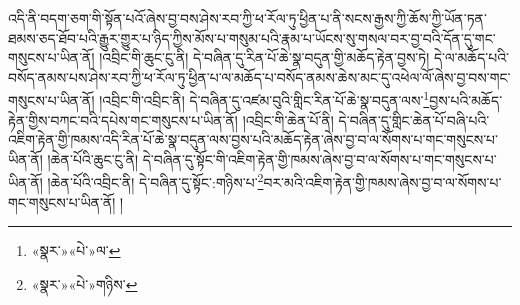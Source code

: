 འདི་ནི་བདག་ཅག་གི་སྟོན་པའོ་ཞེས་བྱ་བས་ཤེས་རབ་ཀྱི་ཕ་རོལ་ཏུ་ཕྱིན་པ་ནི་སངས་རྒྱས་ཀྱི་ཆོས་ཀྱི་ཡོན་ཏན་ཐམས་ཅད་ཐོབ་པའི་རྒྱུར་གྱུར་པ་ཉིད་ཀྱིས་མོས་པ་གསུམ་པའི་རྣམ་པ་ཡོངས་སུ་གསལ་བར་བྱ་བའི་དོན་དུ་གང་གསུངས་པ་ཡིན་ནོ། །འབྲིང་གི་ཆུང་ངུ་ནི། དེ་བཞིན་དུ་རིན་པོ་ཆེ་སྣ་བདུན་གྱི་མཆོད་རྟེན་བྱས་ཏེ། དེ་ལ་མཆོད་པའི་བསོད་ནམས་པས་ཤེས་རབ་ཀྱི་ཕ་རོལ་ཏུ་ཕྱིན་པ་ལ་མཆོད་པ་བསོད་ནམས་ཆེས་མང་དུ་འཕེལ་ལོ་ཞེས་བྱ་བས་གང་གསུངས་པ་ཡིན་ནོ། །འབྲིང་གི་འབྲིང་ནི། དེ་བཞིན་དུ་འཛམ་བུའི་གླིང་རིན་པོ་ཆེ་སྣ་བདུན་ལས་\footnote{«སྣར་»«པེ་»ལ་}བྱས་པའི་མཆོད་རྟེན་གྱིས་བཀང་བའི་དཔེས་གང་གསུངས་པ་ཡིན་ནོ། །འབྲིང་གི་ཆེན་པོ་ནི། དེ་བཞིན་དུ་གླིང་ཆེན་པོ་བཞི་པའི་འཇིག་རྟེན་གྱི་ཁམས་འདི་རིན་པོ་ཆེ་སྣ་བདུན་ལས་བྱས་པའི་མཆོད་རྟེན་ཞེས་བྱ་བ་ལ་སོགས་པ་གང་གསུངས་པ་ཡིན་ནོ། །ཆེན་པོའི་ཆུང་ངུ་ནི། དེ་བཞིན་དུ་སྟོང་གི་འཇིག་རྟེན་གྱི་ཁམས་ཞེས་བྱ་བ་ལ་སོགས་པ་གང་གསུངས་པ་ཡིན་ནོ། །ཆེན་པོའི་འབྲིང་ནི། དེ་བཞིན་དུ་སྟོང་:གཉིས་པ་\footnote{«སྣར་»«པེ་»གཉིས་}བར་མའི་འཇིག་རྟེན་གྱི་ཁམས་ཞེས་བྱ་བ་ལ་སོགས་པ་གང་གསུངས་པ་ཡིན་ནོ། །
